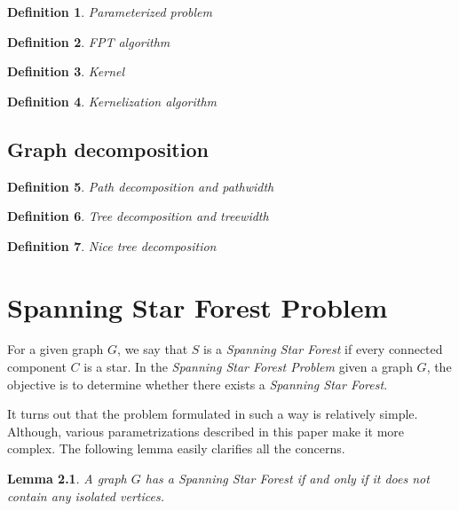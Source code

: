 \documentclass[en]{pracamgr}
\newtheorem{defi}{Definition}
\newtheorem{lemma}{Lemma}
\begin{document}
\begin{defi}\label{Parameterized problem}
	Parameterized problem
\end{defi}

\begin{defi}\label{FPT algorithm}
	FPT algorithm
\end{defi}

\begin{defi}\label{Kernel}
	Kernel
\end{defi}

\begin{defi}\label{Kernelization algorithm}
	Kernelization algorithm
\end{defi}

\section{Graph decomposition}

\begin{defi}\label{Pathwidth}
	Path decomposition and pathwidth
\end{defi}

\begin{defi}\label{Treewidth}
	Tree decomposition and treewidth
\end{defi}

\begin{defi}\label{nice tree decomposition}
	Nice tree decomposition
\end{defi}

\chapter{Spanning Star Forest Problem}\label{r:losers}

For a given graph $G$, we say that $S$ is a \emph{Spanning Star Forest}
if every connected component $C$ is a star. In the 
\emph{Spanning Star Forest Problem} given a graph $G$, the objective is
to determine whether there exists a \emph{Spanning Star Forest}. 

It turns out that the problem formulated in such a way is relatively 
simple. Although, various parametrizations described in this paper 
make it more complex. The following lemma easily clarifies all the 
concerns.

\begin{lemma}\label{SSF lemma}
 A graph $G$ has a Spanning Star Forest if and only if it does not contain
 any isolated vertices.
\end{lemma}
\end{document}
